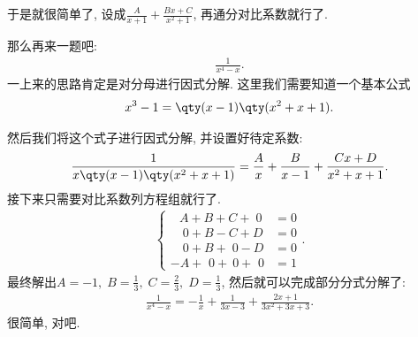 \documentclass{ctexbook}
\begin{document}
{于是就很简单了, 设成$\frac{A}{x+1}+\frac{Bx+C}{x^{2}+1}$, 再通分对比系数就行了. \par
那么再来一题吧: 
\begin{align*}
\frac{1}{x^{4}-x}
.\end{align*}
一上来的思路肯定是对分母进行因式分解. 这里我们需要知道一个基本公式
\begin{align*}
x^{3}-1=\qty(x-1)\qty(x^{2}+x+1)
.\end{align*}\par
然后我们将这个式子进行因式分解, 并设置好待定系数: 
\begin{align*}
\frac{1}{x\qty(x-1)\qty(x^{2}+x+1)}=\frac{A}{x}+\frac{B}{x-1}+\frac{Cx+D}{x^{2}+x+1}
.\end{align*}
接下来只需要对比系数列方程组就行了. 
\begin{align*}
\begin{cases}
\;\;\,A+B+C+\;0&=0\\
\quad0+B-C+D&=0\\
\quad0+B+\;0-D&=0\\
-A+\,\,0+\:0+\,\,0&=1
\end{cases}
.\end{align*}
最终解出$A=-1,\;B=\frac{1}{3},\;C=\frac{2}{3},\;D=\frac{1}{3}$, 然后就可以完成部分分式分解了: 
\begin{align*}
\frac{1}{x^{4}-x}=-\frac{1}{x}+\frac{1}{3x-3}+\frac{2x+1}{3x^{2}+3x+3}
.\end{align*}
很简单, 对吧. \par
}
\end{document}
